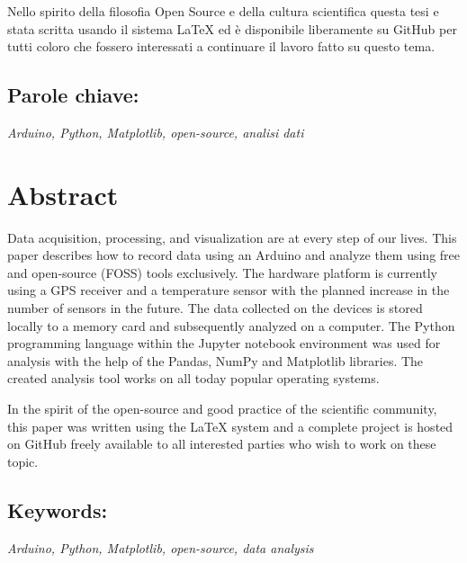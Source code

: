 Nello spirito della filosofia Open Source e della cultura scientifica questa tesi e stata scritta usando il sistema \LaTeX{} ed è disponibile liberamente su GitHub per tutti coloro che fossero interessati a continuare il lavoro fatto su questo tema.

\subsection*{Parole chiave:}\label{kw_it}
\textit{Arduino, Python, Matplotlib, open-source, analisi dati}

\section*{Abstract}\label{sazetak_en}
Data acquisition, processing, and visualization are at every step of our lives.
This paper describes how to record data using an Arduino and analyze them using free and open-source (FOSS) tools exclusively.
The hardware platform is currently using a GPS receiver and a temperature sensor with the planned increase in the number of sensors in the future.
The data collected on the devices is stored locally to a memory card and subsequently analyzed on a computer.
The Python programming language within the Jupyter notebook environment was used for analysis with the help of the Pandas, NumPy and Matplotlib libraries.
The created analysis tool works on all today popular operating systems.

In the spirit of the open-source and good practice of the scientific community, this paper was written using the \LaTeX{} system and a complete project is hosted on GitHub freely available to all interested parties who wish to work on these topic.

\subsection*{Keywords:}\label{kw_en}
\textit{Arduino, Python, Matplotlib, open-source, data analysis}